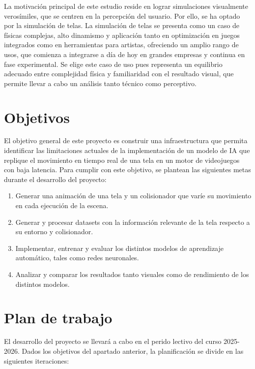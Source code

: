 La motivación principal de este estudio reside en lograr simulaciones visualmente verosímiles, que se centren en la percepción del usuario. Por ello, se ha optado por la simulación de telas. La simulación de telas se presenta como un caso de físicas complejas, alto dinamismo y aplicación tanto en optimización en juegos integrados como en herramientas para artistas, ofreciendo un amplio rango de usos, que comienza a integrarse a día de hoy en grandes empresas y continua en fase experimental. Se elige este caso de uso pues representa un equilibrio adecuado entre complejidad física y familiaridad con el resultado visual, que permite llevar a cabo un análisis tanto técnico como perceptivo.

\section{Objetivos}
El objetivo general de este proyecto es construir una infraestructura que permita identificar las limitaciones actuales de la implementación de un modelo de IA que replique el movimiento en tiempo real de una tela en un motor de videojuegos con baja latencia. Para cumplir con este objetivo, se plantean las siguientes metas durante el desarrollo del proyecto:

\begin{enumerate}
	\item Generar una animación de una tela y un colisionador que varíe su movimiento en cada ejecución de la escena.
	\item Generar y procesar datasets con la información relevante de la tela respecto a su entorno y colisionador.
	\item Implementar, entrenar y evaluar los distintos modelos de aprendizaje automático, tales como redes neuronales.
	\item Analizar y comparar los resultados tanto visuales como de rendimiento de los distintos modelos.
\end{enumerate}

\section{Plan de trabajo}
El desarrollo del proyecto se llevará a cabo en el perido lectivo del curso 2025-2026. Dados los objetivos del apartado anterior, la planificación se divide en las siguientes iteraciones:

